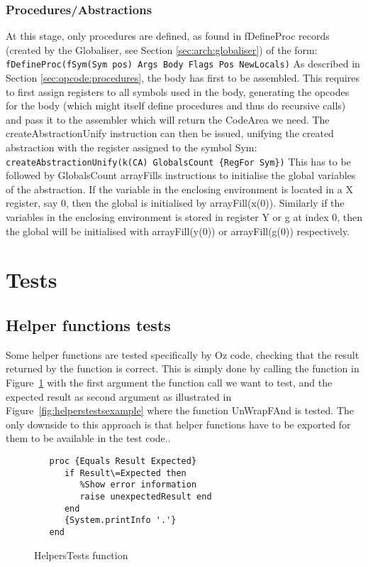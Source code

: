 \documentclass[a4paper]{memoir}
\begin{document}
\subsubsection{Procedures/Abstractions}\label{sec:codegen:procedures}
At this stage, only procedures are defined, as found in fDefineProc records (created by the Globaliser, see Section \ref{sec:arch:globaliser}) of the form:
\lstinline!fDefineProc(fSym(Sym pos) Args Body Flags Pos NewLocals)!
As described in Section \ref{sec:opcode:procedures}, the body has first to be assembled. This requires to first assign registers to all symbols used in the body, generating the opcodes for the body (which might itself define procedures and thus do recursive calls) and pass it to the assembler which will return the CodeArea we need.
The createAbstractionUnify instruction can then be issued, unifying the created abstraction with the register assigned to the symbol Sym:
\lstinline!createAbstractionUnify(k(CA) GlobalsCount {RegFor Sym})!
This has to be followed by GlobalsCount arrayFills instructions to initialise the global variables of the abstraction. If the variable in the enclosing environment is located in a X register, say 0, then the global is initialised by arrayFill(x(0)). Similarly if the variables in the enclosing environment is stored in register Y or g at index 0, then the global will be initialised with arrayFill(y(0)) or arrayFill(g(0)) respectively.
\section{Tests}
\subsection{Helper functions tests}
Some helper functions are tested specifically by Oz code, checking that the result returned by the function is correct. This is simply done by calling the function in Figure~\ref{fig:helperstestsfunction} with the first argument the function call we want to test, and the expected result as second argument as illustrated in Figure~\ref{fig:helperstestsexample} where the function UnWrapFAnd is tested.
The only downside to this approach is that helper functions have to be exported for them to be available in the test code..

\begin{figure}
\begin{lstlisting}
   proc {Equals Result Expected}
      if Result\=Expected then
         %Show error information
         raise unexpectedResult end
      end
      {System.printInfo '.'}
   end
\end{lstlisting}
\label{fig:helperstestsfunction}
\caption{HelpersTests function}
\end{figure}
\end{document}
